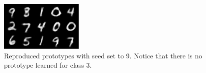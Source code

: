 \begin{figure}[!h]
    \centering
    \includegraphics{img/reproduced9.png}
    \caption{Reproduced prototypes with seed set to 9. Notice that there is no prototype learned for class 3.}
    \label{fig:non3}
\end{figure}